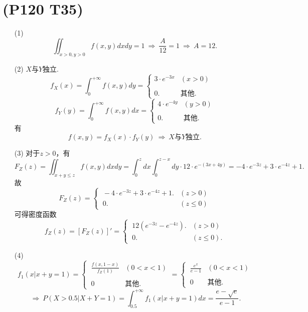 \documentclass{article}
\begin{document}
\section{(P120 T35)}  %
\begin{enumerate}
    \item [(1)]
    \[
        \iint_{x>0,y>0} f(x,y) dx dy = 1
        \ \Rightarrow\ 
        \frac{A}{12} = 1
        \ \Rightarrow\ 
        A = 12.   
    \]
    \item [(2)]
    $X$与$Y$独立.
    \[
        f_{X}(x) 
        = \int_{0}^{+\infty} f(x,y) dy     
        =
        \begin{cases}
           \displaystyle{3\cdot e^{-3x}} & (x>0)\\
           \\
           0. & \mbox{其他}.
        \end{cases} 
        \quad
    \]
    \[
        f_{Y}(y) 
        = \int_{0}^{+\infty} f(x,y) dx     
        =
        \begin{cases}
           \displaystyle{4\cdot e^{-4y}} & (y>0)\\
           \\
           0. & \mbox{其他}.
        \end{cases} 
    \]
    有
    \[
        f(x,y) = f_{X}(x) \cdot f_{Y}(y)  
        \ \Rightarrow\ 
        \mbox{$X$与$Y$独立}.  
    \]
    \item [(3)]
    对于$z>0$，有
    \[
        F_{Z}(z) 
        = \iint_{x+y \leq z} f(x,y) dx dy    
        = \int_{0}^{z} dx \int_{0}^{z-x} dy \cdot 12\cdot e^{-(3x+4y)}
        = -4\cdot e^{-3z} + 3\cdot e^{-4z} + 1.
    \]
    故
    \[
        F_{Z}(z) 
        =
        \begin{cases}
            \ -4\cdot e^{-3z} + 3\cdot e^{-4z} + 1. & (z>0)\\
            \ 0. & (z\leq 0)
        \end{cases}
    \]
    可得密度函数
    \[
        f_{Z}(z) 
        = \left[F_{Z}(z) \right]'    
        = 
        \begin{cases}
            \ 12(e^{-3z} - e^{-4z}). & (z>0)\\
            \ 0. & (z\leq 0).
        \end{cases}
    \]
    \item [(4)]
    \[
        f_1 (x|x+y=1)
        =
        \begin{cases}
            \ \displaystyle{\frac{f(x,1-x)}{f_{Z}(1)}} & (0< x < 1)\\
            \\
            \ 0 & \mbox{其他}.
        \end{cases} 
        = 
        \begin{cases}
            \ \displaystyle{\frac{e^x}{e-1}} & (0<x<1)\\
            \\
            \ 0 & \mbox{其他}.
        \end{cases}
    \]
    \[
        \ \Rightarrow\ 
        P(X>0.5|X+Y=1)
        = \int_{0.5}^{+\infty} f_1 (x|x+y=1) dx
        = \frac{e - \sqrt{e}}{e-1}.
    \]
\end{enumerate}
\end{document}
